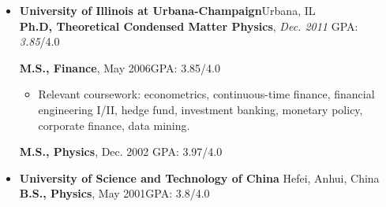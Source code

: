 \documentclass[9.5pt]{article}
\begin{document}
	\begin{itemize}
	\item[] \textbf{University of Illinois at Urbana-Champaign}{\hfill}Urbana, IL \\
	\vspace{1ex}
		\textbf{ Ph.D,  Theoretical Condensed Matter Physics}, \emph{Dec. 2011} {\hfill}GPA: \emph{3.85}/4.0\\		 
		\textbf{ M.S., Finance}, {May 2006}\hfill GPA: {3.85}/4.0\\

	 \begin{itemize}
	 \item Relevant coursework: {econometrics, continuous-time finance, financial engineering I/II, hedge fund, investment banking, monetary policy, corporate finance, data mining}.
		\end{itemize}

	\textbf{ M.S., Physics}, Dec. 2002{\hfill} GPA: 3.97/4.0\\
	\vspace{0.1in}
  \item[]\textbf{University of Science and Technology of China}{\hfill} Hefei, Anhui, China\\
		\textbf{ B.S., Physics}, May 2001{\hfill}GPA: 3.8/4.0
	\end{itemize}
\end{document}
